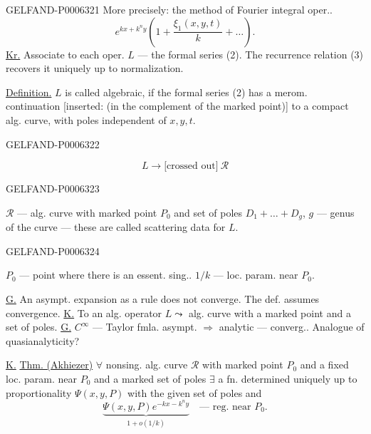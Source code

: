 \begin{GelfandAdjacentEvidence}{GELFAND-P000632}{1}
More precisely: the method of Fourier integral oper..
\[
e^{kx+k^ny}\left(1+\frac{\xi_1(x,y,t)}{k}+\ldots\right).
\]
\underline{Kr.} Associate to each oper. \(L\) --- the formal series (2).
The recurrence relation (3) recovers it uniquely up to normalization.

\underline{Definition.} \(L\) is called algebraic, if the formal series (2)
has a merom. continuation [inserted: (in the complement of the marked point)]
to a compact alg. curve, with poles independent of \(x,y,t\).
\end{GelfandAdjacentEvidence}
\begin{GelfandAdjacentEvidence}{GELFAND-P000632}{2}

\[
L\longrightarrow \text{[crossed out]}\ \mathcal R
\]
\end{GelfandAdjacentEvidence}
\begin{GelfandAdjacentEvidence}{GELFAND-P000632}{3}

\(\mathcal R\) --- alg. curve with marked point \(P_0\) and set of poles
\(D_1+\ldots+D_g\), \(g\) --- genus of the curve
--- these are called scattering data for \(L\).
\end{GelfandAdjacentEvidence}
\begin{GelfandAdjacentEvidence}{GELFAND-P000632}{4}

\(P_0\) --- point where there is an essent. sing..
\(1/k\) --- loc. param. near \(P_0\).

\underline{G.} An asympt. expansion as a rule does not converge.
The def. assumes convergence.
\underline{K.} To an alg. operator \(L\leadsto\) alg. curve with a marked point and a set of poles.
\underline{G.} \(C^\infty\) --- Taylor fmla. asympt. \(\Rightarrow\) analytic --- converg..
Analogue of quasianalyticity?

\underline{K.} \underline{Thm. (Akhiezer)}
\(\forall\) nonsing. alg. curve \(\mathcal R\) with marked point \(P_0\)
and a fixed loc. param. near \(P_0\) and a marked set of poles
\(\exists\) a fn. determined uniquely up to proportionality \(\Psi(x,y,P)\) with the given set of poles and
\[
\underbrace{\Psi(x,y,P)e^{-kx-k^ny}}_{1+o(1/k)}
\quad\text{--- reg. near }P_0.
\]
\end{GelfandAdjacentEvidence}
